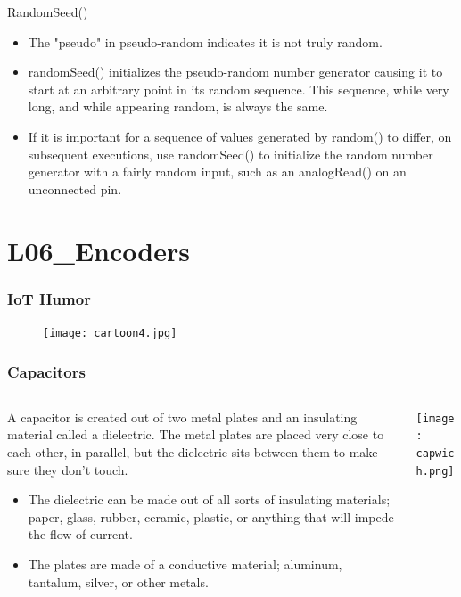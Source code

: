 \documentclass{beamer}
\begin{document}
\begin{frame}{RandomSeed()}
\begin{itemize}
\item The "pseudo" in pseudo-random indicates it is not truly random. 
\item randomSeed() initializes the pseudo-random number generator causing it to start at an arbitrary point in its random sequence. This sequence, while very long, and while appearing random, is always the same.
\item If it is important for a sequence of values generated by random() to differ, on subsequent executions, use randomSeed() to initialize the random number generator with a fairly random input, such as an analogRead() on an unconnected pin.
\end{itemize}
\lstrand
\end{frame}



\section{L06\_Encoders}

\begin{frame}\frametitle{IoT Humor}
\begin{figure}[h]
	\texttt{[image: cartoon4.jpg]}
\end{figure}
\end{frame}

\begin{frame}\frametitle{Capacitors}
\begin{columns}
\begin{column}{7cm}
A capacitor is created out of two metal plates and an insulating material called a dielectric. The metal plates are placed very close to each other, in parallel, but the dielectric sits between them to make sure they don't touch.
\begin{itemize}
\item The dielectric can be made out of all sorts of insulating materials; paper, glass, rubber, ceramic, plastic, or anything that will impede the flow of current.
\item The plates are made of a conductive material; aluminum, tantalum, silver, or other metals. 
\end{itemize}
\end{column}
\begin{column}{4cm}
\begin{overprint}
\texttt{[image: capwich.png]}
\end{overprint}
\end{column}
\end{columns}
\end{frame}
\end{document}
